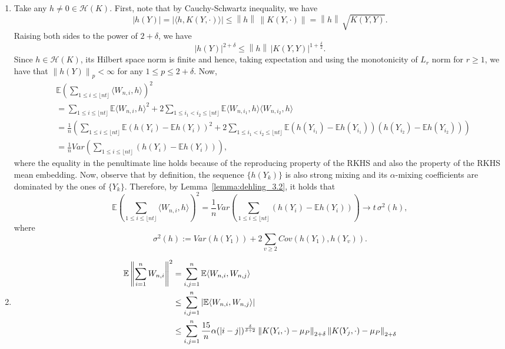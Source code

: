 \documentclass[11pt]{article}
\newcommand{\bE}{\mathbb{E}}
\theoremstyle{plain}
\theoremstyle{definition}
\theoremstyle{remark}
\begin{document}
\begin{appendix}
\begin{enumerate}
        \item [(c)] Take any $h\neq 0 \in \mathcal{H}(K)$. First, note that by Cauchy-Schwartz inequality, we have
        \[|h(Y)|=|\langle h, K(Y,\cdot)\rangle|\leq \left\|h\right\|\,\left\|K(Y,\cdot)\right\|=\left\|h\right\|\,\sqrt{K(Y,Y)}.\]
        Raising both sides to the power of $2+\delta$, we have
        \[|h(Y)|^{2+\delta}\leq \left\|h\right\|\, |K(Y,Y)|^{1+\frac{\delta}{2}}.\]
        Since $h\in \mathcal{H}(K)$, its Hilbert space norm is finite and hence, taking expectation and using the monotonicity of $L_r$ norm for $r\geq 1$, we have that \(\left\|h(Y)\right\|_{p}<\infty\) for any $1\leq p\leq 2+\delta.$ Now,
        \begin{align*}
            &\bE\left(\sum_{1\leq i \leq \lfloor nt \rfloor} \langle W_{n,i},h \rangle\right)^2\\
            &=\sum_{1\leq i \leq \lfloor nt \rfloor} \bE \langle W_{n,i},h\rangle^2+2\sum_{1\leq i_1<i_2\leq \lfloor nt \rfloor} \bE \langle W_{n,i_1},h\rangle \langle W_{n,i_2},h\rangle \\
            &=\frac{1}{n}\left(\sum_{1\leq i \leq \lfloor nt \rfloor} \bE (h(Y_i)-\bE h(Y_i))^2+2\sum_{1\leq i_1<i_2\leq \lfloor nt \rfloor} \bE (h(Y_{i_1})-\bE h(Y_{i_1}))(h(Y_{i_2})-\bE h(Y_{i_2})) \right)\\
            &=\frac{1}{n}Var \left(\sum_{1\leq i \leq \lfloor nt \rfloor} (h(Y_i)-\bE h(Y_i))\right),
        \end{align*}
        where the equality in the penultimate line holds because of the reproducing property of the RKHS and also the property of the RKHS mean embedding. Now, observe that by definition, the sequence $\{h(Y_k)\}$ is also strong mixing and its $\alpha$-mixing coefficients are dominated by the ones of $\{Y_k\}$. Therefore, by Lemma~\ref{lemma:dehling_3.2}, it holds that
        \[\bE\left(\sum_{1\leq i \leq \lfloor nt \rfloor} \langle W_{n,i},h \rangle\right)^2=\frac{1}{n}Var \left(\sum_{1\leq i \leq \lfloor nt \rfloor} (h(Y_i)-\bE h(Y_i))\right)\to t\,\sigma^2(h),\]
        where
        \[\sigma^2(h):=Var(h(Y_1))+2\sum_{v\geq 2}Cov(h(Y_1),h(Y_v)).\]
    \item [(d)] \begin{align*}
        \bE \left\|\sum_{i=1}^{n} W_{n,i}\right\|^2
        &=\sum_{i,j=1}^{n}\bE \langle W_{n,i}, W_{n,j}\rangle\allowdisplaybreaks\\
        &\leq \sum_{i,j=1}^{n}|\bE\langle W_{n,i}, W_{n,j}\rangle|\\
        &\leq \sum_{i,j=1}^{n} \frac{15}{n}\alpha(|i-j|)^{\frac{\delta}{\delta+2}}\left\|K(Y_i,\cdot)-\mu_P\right\|_{2+\delta} \left\|K(Y_j,\cdot)-\mu_P\right\|_{2+\delta} \\

\end{align*}
\end{enumerate}
\end{appendix}
\end{document}
